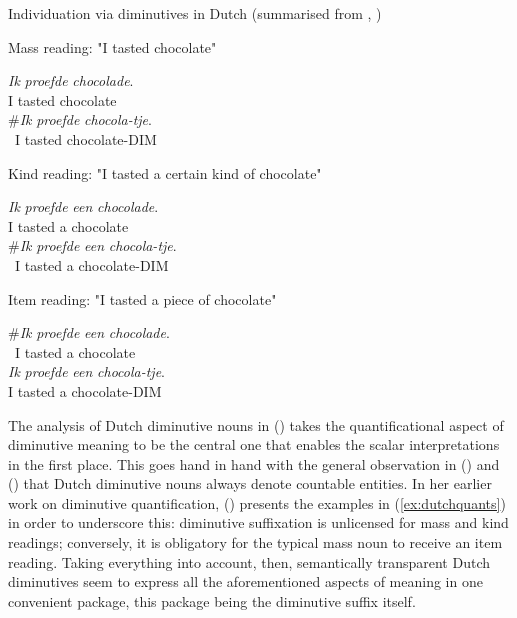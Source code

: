 \begin{exe}
\ex \label{ex:dutchquants}
Individuation via diminutives in Dutch (summarised from \citeauthor{DeBelder+2008}, \citeyear{DeBelder+2008})
\begin{xlist}
\ex \label{ex:dutchmass}
Mass reading: "I tasted chocolate" \par
\begin{multicols}{2}
\gll
\textit{Ik} \textit{proefde} \textit{chocolade}.\\
I tasted chocolate \\
\trans
\columnbreak
\gll
\#\textit{Ik} \textit{proefde} \textit{chocola-tje}.\\
~I tasted chocolate-DIM \\
\trans
\end{multicols}
\ex \label{ex:dutchkind} 
Kind reading: "I tasted a certain kind of chocolate" \par
\begin{multicols}{2}
\gll
\textit{Ik} \textit{proefde} \textit{een} \textit{chocolade}.\\
I tasted a chocolate \\
\trans
\columnbreak
\gll
\#\textit{Ik} \textit{proefde} \textit{een} \textit{chocola-tje}.\\
~I tasted a chocolate-DIM \\
\trans
\end{multicols}
\ex \label{ex:dutchitem}
Item reading: "I tasted a piece of chocolate" \par
\begin{multicols}{2}
\gll
\#\textit{Ik} \textit{proefde} \textit{een} \textit{chocolade}.\\
~I tasted a chocolate \\
\trans
\columnbreak
\gll
\textit{Ik} \textit{proefde} \textit{een} \textit{chocola-tje}.\\
I tasted a chocolate-DIM \\
\trans
\end{multicols}
\end{xlist}
\end{exe}

The analysis of Dutch diminutive nouns in \citeauthor{DeBelder+2022} (\citeyear{DeBelder+2022}) takes the quantificational aspect of diminutive meaning to be the central one that enables the scalar interpretations in the first place. This goes hand in hand with the general observation in \citeauthor{Wiltschko+2006} (\citeyear{Wiltschko+2006}) and \citeauthor{taalportaal} (\citeyear{taalportaal}) that Dutch diminutive nouns always denote countable entities. In her earlier work on diminutive quantification, \citeauthor{DeBelder+2008} (\citeyear{DeBelder+2008}) presents the examples in (\ref{ex:dutchquants}) in order to underscore this: diminutive suffixation is unlicensed for mass and kind readings; conversely, it is obligatory for the typical mass noun to receive an item reading. Taking everything into account, then, semantically transparent Dutch diminutives seem to express all the aforementioned aspects of meaning in one convenient package, this package being the diminutive suffix itself. 

